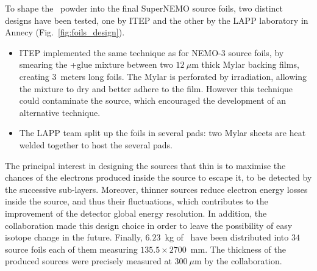 To shape the \Se\ powder into the final SuperNEMO source foils, two distinct designs have been tested, one by ITEP and the other by the LAPP laboratory in Annecy (Fig.~\ref{fig:foils_design}).
\begin{itemize}
\item ITEP implemented the same technique as for NEMO-$3$ source foils, by smearing the \Se+glue mixture between two $12~\mu$m thick Mylar backing films, creating $3$~meters long foils.
  The Mylar is perforated by irradiation, allowing the mixture to dry and better adhere to the film.
  However this technique could contaminate the source, which encouraged the development of an alternative technique.
\item The LAPP team split up the foils in several pads: two Mylar sheets are heat welded together to host the several pads.
\end{itemize}
The principal interest in designing the sources that thin is to maximise the chances of the electrons produced inside the source to escape it, to be detected by the successive sub-layers.
Moreover, thinner sources reduce electron energy losses inside the source, and thus their fluctuations, which contributes to the improvement of the detector global energy resolution.
In addition, the collaboration made this design choice in order to leave the possibility of easy isotope change in the future.
Finally, $6.23$~kg of \Se\ have been distributed into $34$ source foils each of them measuring $135.5\times2700$~mm.
The thickness of the produced sources were precisely measured at $300~\mu$m by the collaboration.
